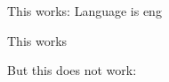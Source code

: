 \documentclass[twoside,14pt,a4paper]{extarticle}
\newcommand{\kLanguage}{eng}
\begin{document}
This works: Language is \kLanguage

This works
 

But this does not work:
\section{}
\end{document}
